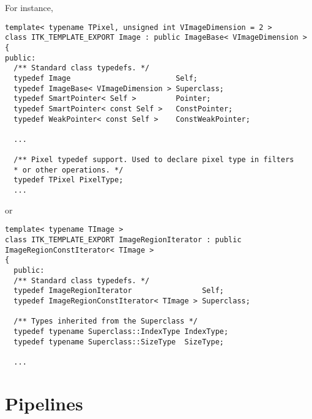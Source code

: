 For instance,

\small
\begin{verbatim}
template< typename TPixel, unsigned int VImageDimension = 2 >
class ITK_TEMPLATE_EXPORT Image : public ImageBase< VImageDimension >
{
public:
  /** Standard class typedefs. */
  typedef Image                        Self;
  typedef ImageBase< VImageDimension > Superclass;
  typedef SmartPointer< Self >         Pointer;
  typedef SmartPointer< const Self >   ConstPointer;
  typedef WeakPointer< const Self >    ConstWeakPointer;

  ...

  /** Pixel typedef support. Used to declare pixel type in filters
  * or other operations. */
  typedef TPixel PixelType;
  ...
\end{verbatim}
\normalsize

or

\small
\begin{verbatim}
template< typename TImage >
class ITK_TEMPLATE_EXPORT ImageRegionIterator : public ImageRegionConstIterator< TImage >
{
  public:
  /** Standard class typedefs. */
  typedef ImageRegionIterator                Self;
  typedef ImageRegionConstIterator< TImage > Superclass;

  /** Types inherited from the Superclass */
  typedef typename Superclass::IndexType IndexType;
  typedef typename Superclass::SizeType  SizeType;

  ...
\end{verbatim}
\normalsize


\section{Pipelines}
\label{sec:Pipelines}

